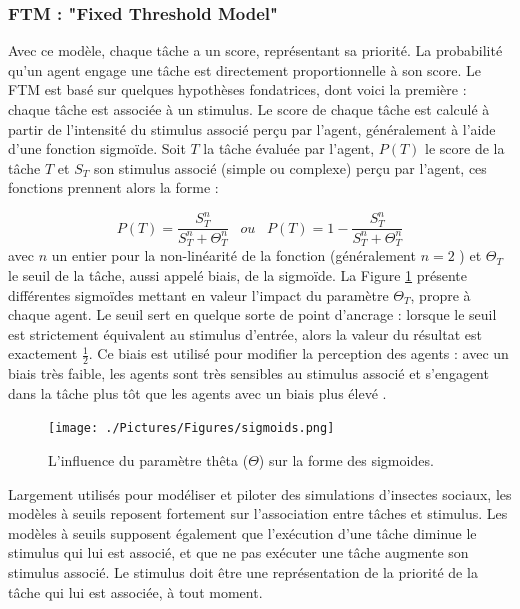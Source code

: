 		\subsubsection{FTM : "Fixed Threshold Model" \cite{bonabeau_natural_1999}}
        Avec ce modèle, chaque tâche a un score, représentant sa priorité. La probabilité qu'un agent engage une tâche est directement proportionnelle à son score. Le FTM est basé sur quelques hypothèses fondatrices, dont voici la première : chaque tâche est associée à un stimulus. Le score de chaque tâche est calculé à partir de l'intensité du stimulus associé perçu par l'agent, généralement à l'aide d'une fonction sigmoïde. Soit $T$ la tâche évaluée par l'agent, $P(T)$ le score de la tâche $T$ et $S_T$ son stimulus associé (simple ou complexe) perçu par l'agent, ces fonctions prennent alors la forme :
			
\begin{equation}
\label{equationSigmoid}
	P(T) = \frac{S_T^n}{S_T^n + \Theta_T^n} \;\;\; ou \;\;\; P(T) = 1 - \frac{S_T^n}{S_T^n + \Theta_T^n}
\end{equation}	
 avec $n$ un entier pour la non-linéarité de la fonction (généralement $n=2$ \cite{schmickl_taskselsim_2008, gautrais_emergent_2002}) et $\Theta_T$ le seuil de la tâche, aussi appelé biais, de la sigmoïde. La Figure \ref{sigmoids} présente différentes sigmoïdes mettant en valeur l'impact du paramètre $\Theta_T$, propre à chaque agent. Le seuil sert en quelque sorte de point d'ancrage : lorsque le seuil est strictement équivalent au stimulus d'entrée, alors la valeur du résultat est exactement $\frac{1}{2}$. Ce biais est utilisé pour modifier la perception des agents : avec un biais très faible, les agents sont très sensibles au stimulus associé et s'engagent dans la tâche plus tôt que les agents avec un biais plus élevé \cite{dornhaus_task_1998}. 
		
		\begin{figure}
		\centering
		\texttt{[image: ./Pictures/Figures/sigmoids.png]}
		\caption{L'influence du paramètre thêta ($\Theta$) sur la forme des sigmoides.}
		\label{sigmoids}
		\end{figure}
        
        Largement utilisés pour modéliser et piloter des simulations d'insectes sociaux, les modèles à seuils reposent fortement sur l'association entre tâches et stimulus. Les modèles à seuils supposent également que l'exécution d'une tâche diminue le stimulus qui lui est associé, et que ne pas exécuter une tâche augmente son stimulus associé. Le stimulus doit être une représentation de la priorité de la tâche qui lui est associée, à tout moment. 
        
